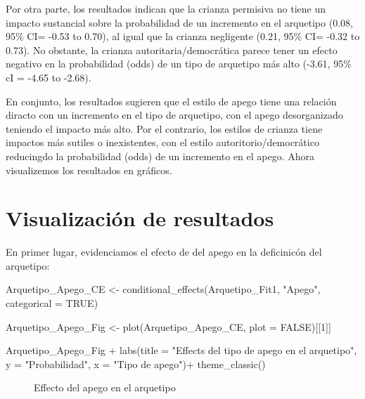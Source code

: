 \documentclass[
  letterpaper,
  DIV=11,
  numbers=noendperiod]{scrartcl}
\newenvironment{Shaded}{\begin{snugshade}}{\end{snugshade}}
\newcommand{\AttributeTok}[1]{\textcolor[rgb]{0.40,0.45,0.13}{#1}}
\newcommand{\ConstantTok}[1]{\textcolor[rgb]{0.56,0.35,0.01}{#1}}
\newcommand{\DecValTok}[1]{\textcolor[rgb]{0.68,0.00,0.00}{#1}}
\newcommand{\FunctionTok}[1]{\textcolor[rgb]{0.28,0.35,0.67}{#1}}
\newcommand{\NormalTok}[1]{\textcolor[rgb]{0.00,0.23,0.31}{#1}}
\newcommand{\OtherTok}[1]{\textcolor[rgb]{0.00,0.23,0.31}{#1}}
\newcommand{\SpecialCharTok}[1]{\textcolor[rgb]{0.37,0.37,0.37}{#1}}
\newcommand{\StringTok}[1]{\textcolor[rgb]{0.13,0.47,0.30}{#1}}
\begin{document}
Por otra parte, los resultados indican que la crianza permisiva no tiene
un impacto sustancial sobre la probabilidad de un incremento en el
arquetipo (0.08, 95\% CI= -0.53 to 0.70), al igual que la crianza
negligente (0.21, 95\% CI= -0.32 to 0.73). No obstante, la crianza
autoritaria/democrática parece tener un efecto negativo en la
probabilidad (odds) de un tipo de arquetipo más alto (-3.61, 95\% cI =
-4.65 to -2.68).

En conjunto, los resultados sugieren que el estilo de apego tiene una
relación diracto con un incremento en el tipo de arquetipo, con el apego
desorganizado teniendo el impacto más alto. Por el contrario, los
estilos de crianza tiene impactos más sutiles o inexistentes, con el
estilo autoritorio/democrático reducingdo la probabilidad (odds) de un
incremento en el apego. Ahora visualizemos los resultados en gráficos.

\section{Visualización de
resultados}\label{visualizaciuxf3n-de-resultados}

En primer lugar, evidenciamos el efecto de del apego en la deficinicón
del arquetipo:

\begin{Shaded}
\begin{Highlighting}[]
\NormalTok{Arquetipo\_Apego\_CE }\OtherTok{\textless{}{-}} \FunctionTok{conditional\_effects}\NormalTok{(Arquetipo\_Fit1, }\StringTok{"Apego"}\NormalTok{, }\AttributeTok{categorical =} \ConstantTok{TRUE}\NormalTok{) }

\NormalTok{Arquetipo\_Apego\_Fig }\OtherTok{\textless{}{-}} \FunctionTok{plot}\NormalTok{(Arquetipo\_Apego\_CE, }\AttributeTok{plot =} \ConstantTok{FALSE}\NormalTok{)[[}\DecValTok{1}\NormalTok{]]}

\NormalTok{Arquetipo\_Apego\_Fig }\SpecialCharTok{+}
  \FunctionTok{labs}\NormalTok{(}\AttributeTok{title =} \StringTok{"Effects del tipo de apego en el arquetipo"}\NormalTok{,}
       \AttributeTok{y =} \StringTok{"Probabilidad"}\NormalTok{,}
       \AttributeTok{x =} \StringTok{"Tipo de apego"}\NormalTok{)}\SpecialCharTok{+}
  \FunctionTok{theme\_classic}\NormalTok{()}
\end{Highlighting}
\end{Shaded}

\begin{figure}[H]


\caption{\label{fig-Arquetipo_CE_Apego}Effecto del apego en el
arquetipo}

\end{figure}%
\end{document}

